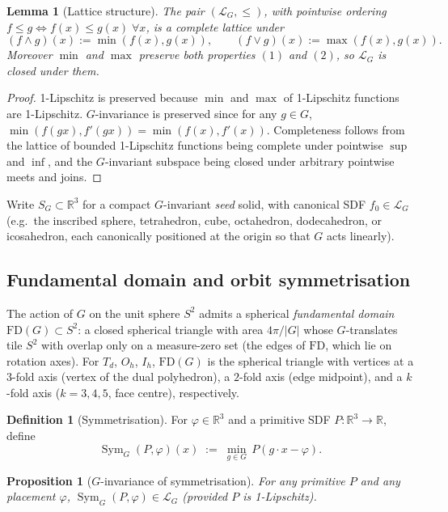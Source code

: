 \documentclass[11pt]{article}
\newtheorem{proposition}[theorem]{Proposition}
\newtheorem{lemma}[theorem]{Lemma}
\theoremstyle{definition}
\newtheorem{definition}[theorem]{Definition}
\DeclareMathOperator{\Sym}{Sym}
\begin{document}
\begin{lemma}[Lattice structure]
\label{lem:lattice}
The pair $(\mathcal{L}_G, \le)$, with pointwise ordering $f \le g \iff
f(x) \le g(x)\; \forall x$, is a complete lattice under
\[
  (f \wedge g)(x) := \min(f(x), g(x)), \qquad
  (f \vee g)(x) := \max(f(x), g(x)).
\]
Moreover $\min$ and $\max$ preserve both properties $(1)$ and $(2)$, so
$\mathcal{L}_G$ is closed under them.
\end{lemma}

\begin{proof}
1-Lipschitz is preserved because $\min$ and $\max$ of 1-Lipschitz functions
are 1-Lipschitz. $G$-invariance is preserved since for any $g \in G$,
$\min(f(gx), f'(gx)) = \min(f(x), f'(x))$. Completeness follows from the
lattice of bounded 1-Lipschitz functions being complete under pointwise
$\sup$ and $\inf$, and the $G$-invariant subspace being closed under
arbitrary pointwise meets and joins.
\end{proof}

Write $S_G \subset \mathbb{R}^3$ for a compact $G$-invariant \emph{seed}
solid, with canonical SDF $f_0 \in \mathcal{L}_G$ (e.g.\ the inscribed
sphere, tetrahedron, cube, octahedron, dodecahedron, or icosahedron,
each canonically positioned at the origin so that $G$ acts linearly).

\subsection{Fundamental domain and orbit symmetrisation}

The action of $G$ on the unit sphere $S^2$ admits a spherical
\emph{fundamental domain} $\mathrm{FD}(G) \subset S^2$: a closed
spherical triangle with area $4\pi/|G|$ whose $G$-translates tile $S^2$
with overlap only on a measure-zero set (the edges of $\mathrm{FD}$,
which lie on rotation axes). For $T_d$, $O_h$, $I_h$, $\mathrm{FD}(G)$
is the spherical triangle with vertices at a $3$-fold axis (vertex of
the dual polyhedron), a $2$-fold axis (edge midpoint), and a $k$-fold
axis ($k=3,4,5$, face centre), respectively.

\begin{definition}[Symmetrisation]
For $\varphi \in \mathbb{R}^3$ and a primitive SDF $P : \mathbb{R}^3 \to
\mathbb{R}$, define
\[
  \Sym_G(P, \varphi)(x) \;:=\; \min_{g \in G}\, P(g\cdot x - \varphi).
\]
\end{definition}

\begin{proposition}[$G$-invariance of symmetrisation]
\label{prop:ginv}
For any primitive $P$ and any placement $\varphi$,
$\Sym_G(P, \varphi) \in \mathcal{L}_G$ (provided $P$ is 1-Lipschitz).
\end{proposition}
\end{document}
